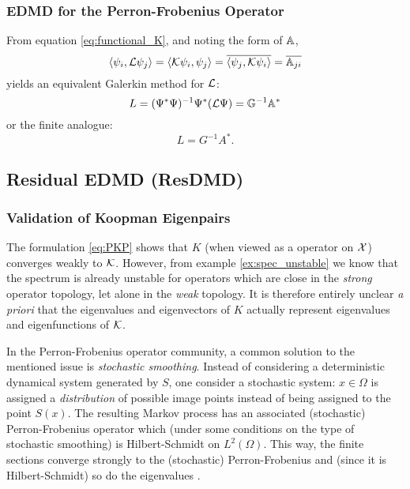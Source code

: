 
\subsubsection{EDMD for the Perron-Frobenius Operator}

From equation \ref{eq:functional_K}, and noting the form of $\mathbb{A}$, 
\begin{equation}
    \left\langle \psi_i, \mathcal{L} \psi_j \right\rangle 
    = \left\langle \mathcal{K} \psi_i, \psi_j \right\rangle 
    = \overline{ \left\langle \psi_j, \mathcal{K} \psi_i \right\rangle } 
    = \overline{\mathbb{A}_{j i}}
\end{equation}
yields an equivalent Galerkin method for $\mathcal{L}$:
\begin{equation}
    L = (\Psi^* \Psi)^{-1} \Psi^* (\mathcal{L} \Psi) = \mathbb{G}^{-1} \mathbb{A}^* 
\end{equation}
or the finite analogue:
\begin{equation}
    L = G^{-1} A^* . 
\end{equation}

\subsection{Residual EDMD (ResDMD)}


\subsubsection{Validation of Koopman Eigenpairs}\label{sec:validation}

The formulation \ref{eq:PKP} shows that $K$ (when viewed as a operator on $\mathcal{X}$) 
converges weakly to $\mathcal{K}$. However, from example \ref{ex:spec_unstable} we know that 
the spectrum is already unstable for operators which are close in the \emph{strong} 
operator topology, let alone in the \emph{weak} topology. It is therefore entirely 
unclear \emph{a priori} that the eigenvalues and eigenvectors of $K$ actually represent 
eigenvalues and eigenfunctions of $\mathcal{K}$. 

In the Perron-Frobenius operator community, a common solution to the mentioned issue is 
\emph{stochastic smoothing}. Instead of considering a deterministic dynamical system 
generated by $S$, one consider a stochastic system: $x \in \Omega$ is 
assigned a \emph{distribution} of possible image points instead of being assigned to 
the point $S(x)$. The resulting Markov process has an associated (stochastic) 
Perron-Frobenius operator which (under some conditions on the type of stochastic 
smoothing) is Hilbert-Schmidt on $L^2 (\Omega)$. This way, the finite sections converge 
strongly to the (stochastic) Perron-Frobenius and (since it is Hilbert-Schmidt) so do 
the eigenvalues \cite{attr}. 

